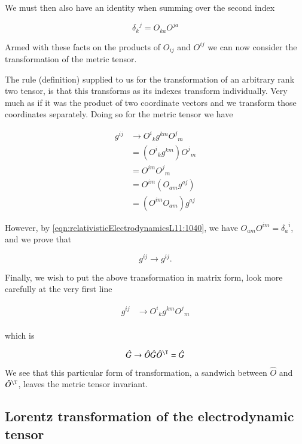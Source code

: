 We must then also have an identity when summing over the second index

\begin{equation}\label{eqn:relativisticElectrodynamicsL11:1040}
{\delta_{k}}^j = O_{k a} O^{j a} 
\end{equation}

Armed with these facts on the products of $O_{i j}$ and $O^{i j}$ we can now consider the transformation of the metric tensor.

The rule (definition) supplied to us for the transformation of an arbitrary rank two tensor, is that this transforms as its indexes transform individually.  Very much as if it was the product of two coordinate vectors and we transform those coordinates separately.  Doing so for the metric tensor we have

\begin{align*}
g^{i j} 
&\rightarrow {O^i}_k g^{k m} {O^j}_m \\
&= ({O^i}_k g^{k m}) {O^j}_m \\
&= O^{i m} {O^j}_m \\
&= O^{i m} (O_{a m} g^{a j}) \\
&= (O^{i m} O_{a m}) g^{a j}
\end{align*}

However, by \ref{eqn:relativisticElectrodynamicsL11:1040}, we have $O_{a m} O^{i m} = {\delta_a}^i$, and we prove that 

\begin{equation}\label{eqn:relativisticElectrodynamicsL11:960}
g^{i j} \rightarrow g^{i j}.
\end{equation}

Finally, we wish to put the above transformation in matrix form, look more carefully at the very first line

\begin{align*}
g^{i j}
&\rightarrow {O^i}_k g^{k m} {O^j}_m \\
\end{align*}

which is

\begin{equation}\label{eqn:relativisticElectrodynamicsL11:1070}
\hat{G} \rightarrow \hat{O} \hat{G} \hat{O}^\T = \hat{G}
\end{equation}

We see that this particular form of transformation, a sandwich between $\hat{O}$ and $\hat{O}^\T$, leaves the metric tensor invariant.  

\subsection{Lorentz transformation of the electrodynamic tensor}

